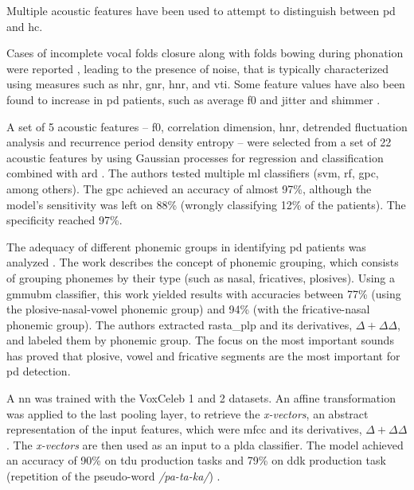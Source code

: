 Multiple acoustic features have been used to attempt to distinguish between \gls{pd} and \gls{hc}.

Cases of incomplete vocal folds closure along with folds bowing during phonation were reported \cite{features_explained}, leading to the presence of noise, that is typically characterized using measures such as \gls{nhr}, \gls{gnr}, \gls{hnr}, and \gls{vti}. Some feature values have also been found to increase in \gls{pd} patients, such as average \gls{f0} and jitter \cite{f0_jitter} and shimmer \cite{shimmer}.

A set of 5 acoustic features -- \gls{f0}, correlation dimension,  \gls{hnr}, detrended fluctuation analysis and recurrence period density entropy -- were selected from a set of 22 acoustic features by using Gaussian processes for regression and classification combined with \gls{ard} \cite{parkinson_acoustic_despotovic}. The authors tested multiple \gls{ml} classifiers (\gls{svm}, \gls{rf}, \gls{gpc}, among others). The \gls{gpc} achieved an accuracy of almost 97\%, although the model's sensitivity was left on 88\% (wrongly classifying 12\% of the patients). The specificity reached 97\%.

The adequacy of different phonemic groups in identifying \gls{pd} patients was analyzed \cite{parkinson_phonemic_relevance}. The work describes the concept of phonemic grouping, which consists of grouping phonemes by their type (such as nasal, fricatives, plosives). Using a \gls{gmmubm} classifier, this work yielded results with accuracies between 77\% (using the plosive-nasal-vowel phonemic group) and 94\% (with the fricative-nasal phonemic group). The authors extracted \gls{rasta_plp} \cite{rastaPLP} and its derivatives, $\Delta + \Delta \Delta$, and labeled them by phonemic group. The focus on the most important sounds has proved that plosive, vowel and fricative segments are the most important for \gls{pd} detection.

A \gls{nn} was trained with the VoxCeleb 1 \cite{voxceleb1} and 2 \cite{voxceleb2} datasets. An affine transformation was applied to the last pooling layer, to retrieve the \textit{x-vectors}, an abstract representation of the input features, which were \gls{mfcc} and its derivatives, $\Delta + \Delta \Delta$. The \textit{x-vectors} are then used as an input to a \gls{plda} classifier. The model achieved an accuracy of 90\% on \gls{tdu} production tasks and 79\% on \gls{ddk} production task (repetition of the pseudo-word \textit{/pa-ta-ka/}) \cite{x_vector_parkinson}.

